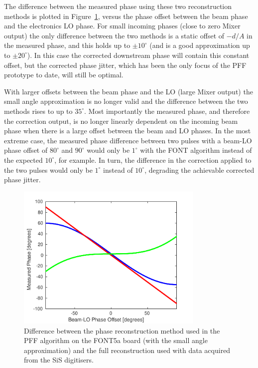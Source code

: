 The difference between the measured phase using these two reconstruction methods is plotted in Figure~\ref{f:phaseRecDiff}, versus the phase offset between the beam phase and the electronics LO phase. For small incoming phases (close to zero Mixer output) the only difference between the two methods is a static offset of \(-d/A\) in the measured phase, and this holds up to \(\pm10^\circ\) (and is a good approximation up to \(\pm20^\circ\)). In this case the corrected downstream phase will contain this constant offset, but the corrected phase jitter, which has been the only focus of the PFF prototype to date, will still be optimal. 

With larger offsets between the beam phase and the LO (large Mixer output) the small angle approximation is no longer valid and the difference between the two methods rises to up to \(35^\circ\). Most importantly the measured phase, and therefore the correction output, is no longer linearly dependent on the incoming beam phase when there is a large offset between the beam and LO phases. In the most extreme case, the measured phase difference between two pulses with a beam-LO phase offset of \(80^\circ\) and \(90^\circ\) would only be \(1^\circ\) with the FONT algorithm instead of the expected \(10^\circ\), for example. In turn, the difference in the correction applied to the two pulses would only be \(1^\circ\) instead of \(10^\circ\), degrading the achievable corrected phase jitter.

\begin{figure}
  \centering
  \includegraphics[width=0.8\textwidth]{Figures/commissioning/phaseRecDiff}
  \caption{Difference between the phase reconstruction method used in the PFF algorithm on the FONT5a board (with the small angle approximation) and the full reconstruction used with data acquired from the SiS digitisers.}
  \label{f:phaseRecDiff}
\end{figure}

